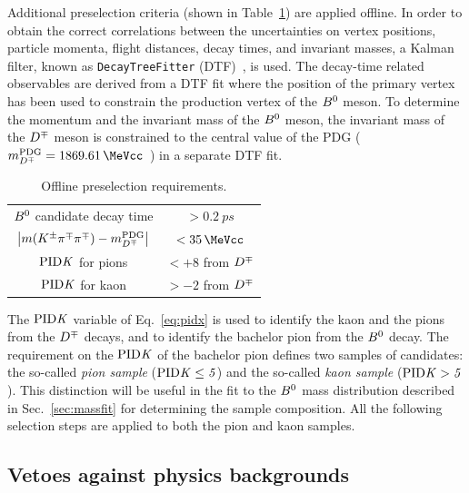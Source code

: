 Additional preselection criteria (shown in Table~\ref{tab:preselection}) are
applied offline. In order to obtain the correct correlations between the uncertainties
on vertex positions, particle momenta, flight distances, decay times, and
invariant masses, a Kalman filter, known as \verb!DecayTreeFitter! (DTF)~\cite{DTF}, is used. 
The decay-time related observables are derived
from a DTF fit where the position of the primary vertex has been used to
constrain the production vertex of the $B^0$ meson. To determine the momentum and
the invariant mass of the $B^0$ meson, the invariant mass of the $D^\mp$ meson is
constrained to the central value of the PDG
($m_{\Dmp}^\text{PDG}=\SI{1869.61}{\MeVcc}$~\cite{PDG}) in a separate DTF
fit.
%
\begin{table}[t]
	\centering
	\caption{Offline preselection requirements.}
	\begin{tabular}{cc}
		\toprule
		$B^0$ candidate decay time & $>\SI{0.2}{ps}$\\
		$\left|m(K^\pm\pi^\mp\pi^\mp)-m_{D^\mp}^\text{PDG}\right|$ & $<\SI{35}{\MeVcc}$\\
		$\rm{PID}\it{K}$ for pions & $<+8$ from $D^\mp$\\
		$\rm{PID}\it{K}$ for kaon & $>-2$ from $D^\mp$\\
		\bottomrule
	\end{tabular}
	\label{tab:preselection}
\end{table}
%
The $\rm{PID}\it{K}$ variable of Eq.~\ref{eq:pidx} is used to identify the kaon and
the pions from the $D^\mp$ decays, and to identify the bachelor pion from the $B^0$
decay. The requirement on the $\rm{PID}\it{K}$ of the bachelor pion defines two samples
of candidates: the so-called \emph{pion sample }($\rm{PID}\it{K}\leq 5$)
and the so-called \emph{kaon sample} ($\rm{PID}\it{K}>5$). This distinction will be
useful in the fit to the $B^0$ mass distribution described in Sec.~\ref{sec:massfit} for determining the sample
composition. 
All the following selection steps are applied to both the pion and kaon samples.

\subsection{Vetoes against physics backgrounds}
\label{sec:vetoes}


